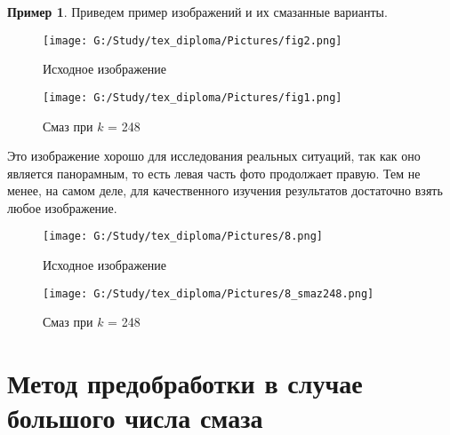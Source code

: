 \documentclass[a4paper]{article}
\theoremstyle{definition}
\newtheorem{example}{Пример}[section]
\begin{document}
\newpage
    \begin{example}
    Приведем пример изображений и их смазанные варианты.

\hspace*{-\parindent}
\begin{minipage}{80mm}
  \begin{figure}[H]
            \texttt{[image: G:/Study/tex\_diploma/Pictures/fig2.png]}
            \label{Fig2}
            \caption[Исходное изображение]{Исходное изображение}
        \end{figure}
\end{minipage}
\begin{minipage}{80mm}
    \begin{figure}[H]
            \texttt{[image: G:/Study/tex\_diploma/Pictures/fig1.png]}
            \label{Fig1}
            \caption[Смаз при $k$ = 248]{Смаз при $k$ = 248}
        \end{figure}
\end{minipage}
\hfill
\vspace*{3mm}


Это изображение хорошо для исследования реальных ситуаций, так как оно является панорамным, то есть левая часть фото продолжает правую. Тем не менее, на самом деле, для качественного изучения результатов достаточно взять любое изображение.

\hspace*{-\parindent}
\begin{minipage}{80mm}
  \begin{figure}[H]
            \texttt{[image: G:/Study/tex\_diploma/Pictures/8.png]}
            \label{Fig_8}
            \caption[Исходное изображение]{Исходное изображение}
        \end{figure}
\end{minipage}
\begin{minipage}{80mm}
    \begin{figure}[H]
            \texttt{[image: G:/Study/tex\_diploma/Pictures/8\_smaz248.png]}
            \label{Fig_8s}
            \caption[Смаз при $k$ = 248]{Смаз при $k$ = 248}
        \end{figure}
\end{minipage}
\hfill

    \end{example}

    \newpage


    \section{Метод предобработки в случае большого числа смаза}
\end{document}
